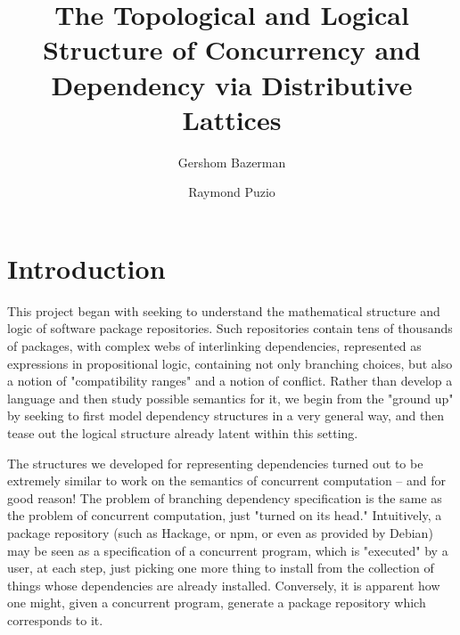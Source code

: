 \documentclass[hoptionsi,review,format=acmsmall]{acmart}
\title[Concurrency and Dependency via Distributive Lattices]{The Topological and Logical Structure of Concurrency and Dependency via Distributive Lattices}
\author{Gershom Bazerman}
\affiliation{%
   \institution{Awake Security}}
\author{Raymond Puzio}
\affiliation{%
   \institution{Albert Einstein Institute}}
\theoremstyle{definition}
\begin{document}
\maketitle

\section{Introduction}
This project began with seeking to understand the mathematical structure and logic of software package repositories. Such repositories contain tens of thousands of packages, with complex webs of interlinking dependencies, represented as expressions in propositional logic, containing not only branching choices, but also a notion of "compatibility ranges" and a notion of conflict. Rather than develop a language and then study possible semantics for it, we begin from the "ground up" by seeking to first model dependency structures in a very general way, and then tease out the logical structure already latent within this setting.

The structures we developed for representing dependencies turned out to be extremely similar to work on the semantics of concurrent computation -- and for good reason! The problem of branching dependency specification is the same as the problem of concurrent computation, just "turned on its head." Intuitively, a package repository (such as Hackage, or npm, or even as provided by Debian) may be seen as a specification of a concurrent program, which is "executed" by a user, at each step, just picking one more thing to install from the collection of things whose dependencies are already installed. Conversely, it is apparent how one might, given a concurrent program, generate a package repository which corresponds to it.
\end{document}
